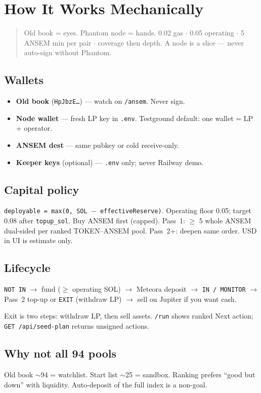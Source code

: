 \chapter{How It Works Mechanically}

\begin{quote}
Old book = eyes. Phantom node = hands.
0.02 gas $\cdot$ 0.05 operating $\cdot$ 5 ANSEM min per pair $\cdot$ coverage then depth.
A node is a slice --- never auto-sign without Phantom.
\end{quote}

\section{Wallets}

\begin{itemize}
  \item \textbf{Old book} (\texttt{HpJbzE\ldots}) --- watch on \texttt{/ansem}. Never sign.
  \item \textbf{Node wallet} --- fresh LP key in \texttt{.env}. Testground default: one wallet = LP + operator.
  \item \textbf{ANSEM dest} --- same pubkey or cold receive-only.
  \item \textbf{Keeper keys} (optional) --- \texttt{.env} only; never Railway demo.
\end{itemize}

\section{Capital policy}

\texttt{deployable = max(0, SOL $-$ effectiveReserve)}. Operating floor 0.05; target 0.08 after \texttt{topup\_sol}.
Buy ANSEM first (capped). Pass~1: $\geq$ 5 whole ANSEM dual-sided per ranked TOKEN--ANSEM pool. Pass~2+: deepen same order. USD in UI is estimate only.

\section{Lifecycle}

\texttt{NOT IN} $\to$ fund ($\geq$ operating SOL) $\to$ Meteora deposit $\to$ \texttt{IN / MONITOR} $\to$ Pass~2 top-up or \texttt{EXIT} (withdraw LP) $\to$ sell on Jupiter if you want cash.

Exit is two steps: withdraw LP, then sell assets. \texttt{/run} shows ranked Next action; \texttt{GET /api/seed-plan} returns unsigned actions.

\section{Why not all 94 pools}

Old book $\sim$94 = watchlist. Start list $\sim$25 = sandbox. Ranking prefers ``good but down'' with liquidity. Auto-deposit of the full index is a non-goal.
